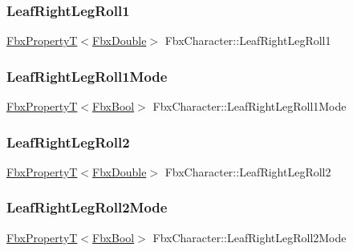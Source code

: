 \subsubsection{\texorpdfstring{Leaf\+Right\+Leg\+Roll1}{LeafRightLegRoll1}}
{\footnotesize\ttfamily \hyperlink{class_fbx_property_t}{Fbx\+PropertyT}$<$\hyperlink{fbxtypes_8h_a171e72a1c46fc15c1a6c9c31948c1c5b}{Fbx\+Double}$>$ Fbx\+Character\+::\+Leaf\+Right\+Leg\+Roll1}

\mbox{\label{class_fbx_character_ae77c249e4396d92d42a10cba450af36d}} 
\subsubsection{\texorpdfstring{Leaf\+Right\+Leg\+Roll1\+Mode}{LeafRightLegRoll1Mode}}
{\footnotesize\ttfamily \hyperlink{class_fbx_property_t}{Fbx\+PropertyT}$<$\hyperlink{fbxtypes_8h_a92e0562b2fe33e76a242f498b362262e}{Fbx\+Bool}$>$ Fbx\+Character\+::\+Leaf\+Right\+Leg\+Roll1\+Mode}

\mbox{\label{class_fbx_character_a33fdc7a31e65ce8815ac1d05cd333339}} 
\subsubsection{\texorpdfstring{Leaf\+Right\+Leg\+Roll2}{LeafRightLegRoll2}}
{\footnotesize\ttfamily \hyperlink{class_fbx_property_t}{Fbx\+PropertyT}$<$\hyperlink{fbxtypes_8h_a171e72a1c46fc15c1a6c9c31948c1c5b}{Fbx\+Double}$>$ Fbx\+Character\+::\+Leaf\+Right\+Leg\+Roll2}

\mbox{\label{class_fbx_character_adc56cbb72fb721c15569e4906be0b2bb}} 
\subsubsection{\texorpdfstring{Leaf\+Right\+Leg\+Roll2\+Mode}{LeafRightLegRoll2Mode}}
{\footnotesize\ttfamily \hyperlink{class_fbx_property_t}{Fbx\+PropertyT}$<$\hyperlink{fbxtypes_8h_a92e0562b2fe33e76a242f498b362262e}{Fbx\+Bool}$>$ Fbx\+Character\+::\+Leaf\+Right\+Leg\+Roll2\+Mode}

